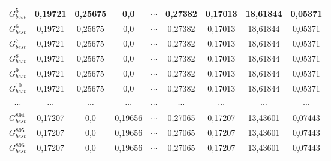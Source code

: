 {{{\begin{tabularx}{\textwidth}{|c|cccccc|c|c|}
    $G_{best}^{5}$   & \multicolumn{1}{c|}{0,19721}                    & \multicolumn{1}{c|}{0,25675}  & \multicolumn{1}{c|}{0,0}      & \multicolumn{1}{c|}{$\cdots$} & \multicolumn{1}{c|}{0,27382}  & 0,17013  & 18,61844 & 0,05371  \\ \hline
    $G_{best}^{6}$   & \multicolumn{1}{c|}{0,19721}                    & \multicolumn{1}{c|}{0,25675}  & \multicolumn{1}{c|}{0,0}      & \multicolumn{1}{c|}{$\cdots$} & \multicolumn{1}{c|}{0,27382}  & 0,17013  & 18,61844 & 0,05371  \\ \hline
    $G_{best}^{7}$   & \multicolumn{1}{c|}{0,19721}                    & \multicolumn{1}{c|}{0,25675}  & \multicolumn{1}{c|}{0,0}      & \multicolumn{1}{c|}{$\cdots$} & \multicolumn{1}{c|}{0,27382}  & 0,17013  & 18,61844 & 0,05371  \\ \hline
    $G_{best}^{8}$   & \multicolumn{1}{c|}{0,19721}                    & \multicolumn{1}{c|}{0,25675}  & \multicolumn{1}{c|}{0,0}      & \multicolumn{1}{c|}{$\cdots$} & \multicolumn{1}{c|}{0,27382}  & 0,17013  & 18,61844 & 0,05371  \\ \hline
    $G_{best}^{9}$   & \multicolumn{1}{c|}{0,19721}                    & \multicolumn{1}{c|}{0,25675}  & \multicolumn{1}{c|}{0,0}      & \multicolumn{1}{c|}{$\cdots$} & \multicolumn{1}{c|}{0,27382}  & 0,17013  & 18,61844 & 0,05371  \\ \hline
    $G_{best}^{10}$  & \multicolumn{1}{c|}{0,19721}                    & \multicolumn{1}{c|}{0,25675}  & \multicolumn{1}{c|}{0,0}      & \multicolumn{1}{c|}{$\cdots$} & \multicolumn{1}{c|}{0,27382}  & 0,17013  & 18,61844 & 0,05371  \\ \hline
    $\cdots$         & \multicolumn{1}{c|}{$\cdots$}                   & \multicolumn{1}{c|}{$\cdots$} & \multicolumn{1}{c|}{$\cdots$} & \multicolumn{1}{c|}{$\cdots$} & \multicolumn{1}{c|}{$\cdots$} & $\cdots$ & $\cdots$ & $\cdots$ \\ \hline
    $G_{best}^{894}$ & \multicolumn{1}{c|}{0,17207}                    & \multicolumn{1}{c|}{0,0}      & \multicolumn{1}{c|}{0,19656}  & \multicolumn{1}{c|}{$\cdots$} & \multicolumn{1}{c|}{0,27065}  & 0,17207  & 13,43601 & 0,07443  \\ \hline
    $G_{best}^{895}$ & \multicolumn{1}{c|}{0,17207}                    & \multicolumn{1}{c|}{0,0}      & \multicolumn{1}{c|}{0,19656}  & \multicolumn{1}{c|}{$\cdots$} & \multicolumn{1}{c|}{0,27065}  & 0,17207  & 13,43601 & 0,07443  \\ \hline
    $G_{best}^{896}$ & \multicolumn{1}{c|}{0,17207}                    & \multicolumn{1}{c|}{0,0}      & \multicolumn{1}{c|}{0,19656}  & \multicolumn{1}{c|}{$\cdots$} & \multicolumn{1}{c|}{0,27065}  & 0,17207  & 13,43601 & 0,07443  \\ \hline

\end{tabularx}}}}
